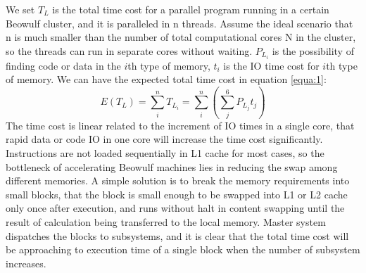 \documentclass[11pt,openright,a4paper]{report}
\begin{document}
We set  $T_{L}$ is the total time cost for a parallel program running in a certain Beowulf cluster, and it is paralleled in n threads. Assume the ideal scenario that n is much smaller than the number of total computational cores N in the cluster, so the threads can run in separate cores without waiting. $P_{L_{i}}$ is the possibility of finding code or data in the ${i}$th type of memory, $t_{i}$ is the IO time cost for ${i}$th type of memory. We can have the expected total time cost in equation \ref{equa:1}:\\
\begin{equation}
\label{equa:1}
E(T_{L})=\sum_{i}^{n}T_{L_{i}}=\sum_{i}^{n}(\sum_{j}^{6}P_{L_{j}}t_{j})
\end{equation}
The time cost is linear related to the increment of IO times in a single core, that rapid data or code IO in one core will increase the time cost significantly.
Instructions are not loaded sequentially in L1 cache for most cases, so the bottleneck of accelerating Beowulf machines lies in reducing the swap among different memories. A simple solution is to break the memory requirements into small blocks, that the block is small enough to be swapped into L1 or L2 cache only once after execution, and runs without halt in content swapping until the result of calculation being transferred to the local memory. Master system dispatches the blocks to subsystems, and it is clear that the total time cost will be approaching to execution time of a single block when the number of subsystem increases.\\
\end{document}
